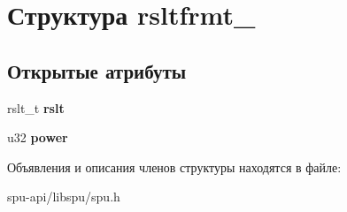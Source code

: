 \hypertarget{structrsltfrmt__1}{}\section{Структура rsltfrmt\+\_}
\label{structrsltfrmt__1}
\subsection*{Открытые атрибуты}
\begin{DoxyCompactItemize}
\item 
\mbox{\label{structrsltfrmt__1_ae8f0fe096836e4141fa183e1f685dc92}} 
rslt\+\_\+t {\bfseries rslt}
\item 
\mbox{\label{structrsltfrmt__1_a4c8f42801f1b448e7b5d321cc004c3ff}} 
u32 {\bfseries power}
\end{DoxyCompactItemize}


Объявления и описания членов структуры находятся в файле\+:\begin{DoxyCompactItemize}
\item 
spu-\/api/libspu/spu.\+h\end{DoxyCompactItemize}
